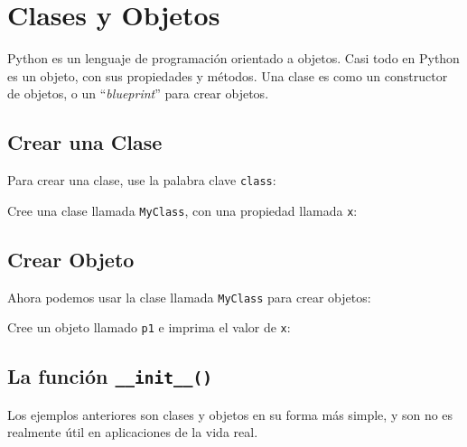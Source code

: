 \chapter{Clases y Objetos}

Python es un lenguaje de programación orientado a objetos. Casi todo en
Python es un objeto, con sus propiedades y métodos. Una clase es como un
constructor de objetos, o un ``\emph{blueprint}'' para crear objetos.

\section{Crear una Clase}

Para crear una clase, use la palabra clave \texttt{class}:

\begin{code}
Cree una clase llamada \texttt{MyClass}, con una propiedad llamada \texttt{x}:

\begin{Shaded}
\begin{Highlighting}[]
\OperatorTok{=} 

\end{Highlighting}
\end{Shaded}
\end{code}

\section{Crear Objeto}
Ahora podemos usar la clase llamada \texttt{MyClass} para crear objetos:

\begin{code}
Cree un objeto llamado \texttt{p1} e imprima el valor de \texttt{x}:

\begin{Shaded}
\begin{Highlighting}[]
\OperatorTok{=}
\end{Highlighting}
\end{Shaded}
\end{code}

\section{\texorpdfstring{La función \texttt{\_\_init\_\_()}}{La función \_\_init\_\_()}}

Los ejemplos anteriores son clases y objetos en su forma más simple, y
son no es realmente útil en aplicaciones de la vida real.

